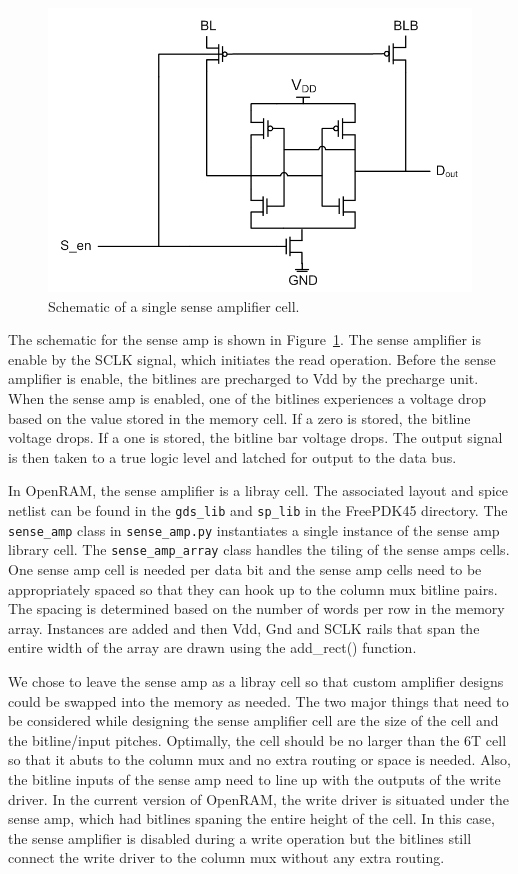 \begin{figure}[h!]
\centering
\includegraphics[scale=.8]{./figs/sense_amp_schem.pdf}
\caption{Schematic of a single sense amplifier cell.}
\label{fig:sense_amp}
\end{figure}

The schematic for the sense amp is shown in
Figure~\ref{fig:sense_amp}.  The sense amplifier is enable by the SCLK
signal, which initiates the read operation.  Before the sense
amplifier is enable, the bitlines are precharged to Vdd by the
precharge unit.  When the sense amp is enabled, one of the bitlines
experiences a voltage drop based on the value stored in the memory
cell.  If a zero is stored, the bitline voltage drops.  If a one is
stored, the bitline bar voltage drops.  The output signal is then
taken to a true logic level and latched for output to the data bus.

In OpenRAM, the sense amplifier is a libray cell.  The associated
layout and spice netlist can be found in the \verb|gds_lib| and \verb|sp_lib| in
the FreePDK45 directory.  The \verb|sense_amp| class in \verb|sense_amp.py|
instantiates a single instance of the sense amp library cell.  The
\verb|sense_amp_array| class handles the tiling of the sense amps cells.
One sense amp cell is needed per data bit and the sense amp cells need
to be appropriately spaced so that they can hook up to the column mux
bitline pairs.  The spacing is determined based on the number of words
per row in the memory array.  Instances are added and then Vdd, Gnd
and SCLK rails that span the entire width of the array are drawn using
the add\_rect() function.

We chose to leave the sense amp as a libray cell so that custom
amplifier designs could be swapped into the memory as needed.  The two
major things that need to be considered while designing the sense
amplifier cell are the size of the cell and the bitline/input pitches.
Optimally, the cell should be no larger than the 6T cell so that it
abuts to the column mux and no extra routing or space is needed.
Also, the bitline inputs of the sense amp need to line up with the
outputs of the write driver.  In the current version of OpenRAM, the
write driver is situated under the sense amp, which had bitlines
spaning the entire height of the cell.  In this case, the sense
amplifier is disabled during a write operation but the bitlines still
connect the write driver to the column mux without any extra routing.



